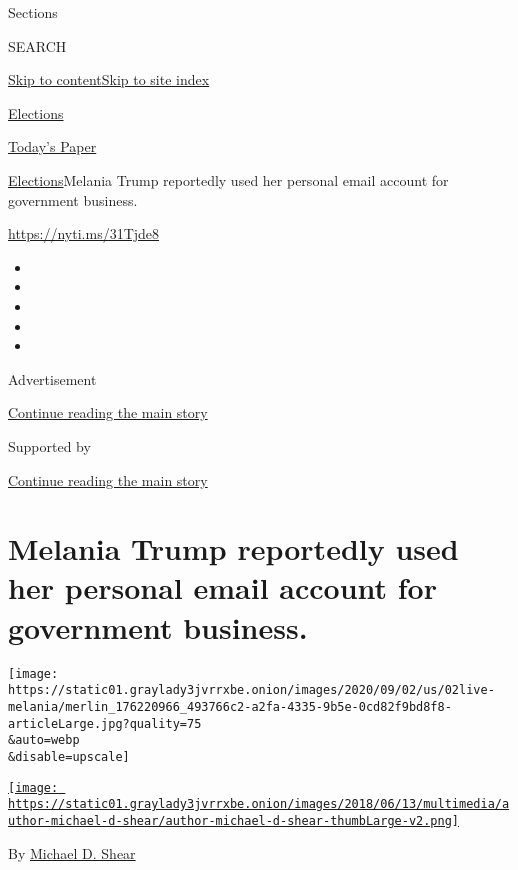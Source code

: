Sections

SEARCH

\protect\hyperlink{site-content}{Skip to
content}\protect\hyperlink{site-index}{Skip to site index}

\href{https://www.nytimes3xbfgragh.onion/news-event/2020-election}{Elections}

\href{https://myaccount.nytimes3xbfgragh.onion/auth/login?response_type=cookie\&client_id=vi}{}

\href{https://www.nytimes3xbfgragh.onion/section/todayspaper}{Today's
Paper}

\href{/news-event/2020-election}{Elections}\textbar{}Melania Trump
reportedly used her personal email account for government business.

\url{https://nyti.ms/31Tjde8}

\begin{itemize}
\item
\item
\item
\item
\item
\end{itemize}

Advertisement

\protect\hyperlink{after-top}{Continue reading the main story}

Supported by

\protect\hyperlink{after-sponsor}{Continue reading the main story}

\hypertarget{melania-trump-reportedly-used-her-personal-email-account-for-government-business}{%
\section{Melania Trump reportedly used her personal email account for
government
business.}\label{melania-trump-reportedly-used-her-personal-email-account-for-government-business}}

\texttt{[image: https://static01.graylady3jvrrxbe.onion/images/2020/09/02/us/02live-melania/merlin\_176220966\_493766c2-a2fa-4335-9b5e-0cd82f9bd8f8-articleLarge.jpg?quality=75\\\&auto=webp\\\&disable=upscale]}

\href{https://www.nytimes3xbfgragh.onion/by/michael-d-shear}{\texttt{[image: https://static01.graylady3jvrrxbe.onion/images/2018/06/13/multimedia/author-michael-d-shear/author-michael-d-shear-thumbLarge-v2.png]}}

By \href{https://www.nytimes3xbfgragh.onion/by/michael-d-shear}{Michael
D. Shear}

